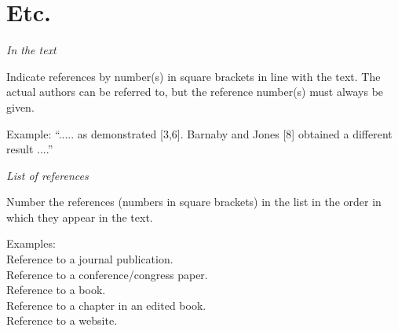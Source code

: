 \documentclass[twocolumn, 10pt]{article}
\begin{document}
\section*{Etc.}

\noindent\textit{In the text}

Indicate references by number(s) in square brackets in line with the text. The actual authors can be referred to, but the reference number(s) must always be given.

Example: “..... as demonstrated [3,6]. Barnaby and Jones [8] obtained a different result ....”

\noindent\textit{List of references}

Number the references (numbers in square brackets) in the list in the order in which they appear in the text.

Examples:\\
Reference to a journal publication\cite{art}.\\
Reference to a conference/congress paper\cite{conf}.\\
Reference to a book\cite{book}.\\
Reference to a chapter in an edited book\cite{chap}.\\
Reference to a website\cite{web}.


\balance


\end{document}
